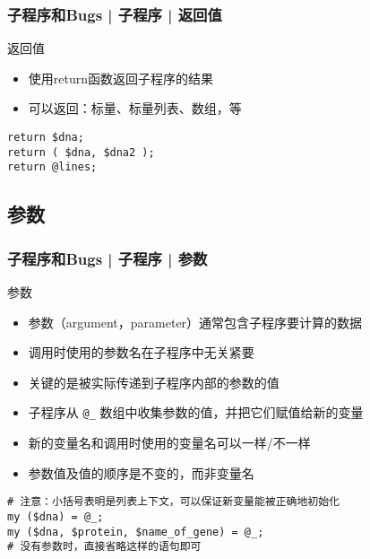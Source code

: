 \begin{frame}[fragile]
  \frametitle{子程序和Bugs | 子程序 | \alert{返回值}}
  \begin{block}{返回值}
    \begin{itemize}
      \item 使用return函数返回子程序的结果
      \item 可以返回：标量、标量列表、数组，等
    \end{itemize}
  \end{block}
\begin{lstlisting}
return $dna;
return ( $dna, $dna2 );
return @lines;
\end{lstlisting}
\end{frame}

\subsection{参数}
\begin{frame}[fragile]
  \frametitle{子程序和Bugs | 子程序 | \alert{参数}}
  \begin{block}{参数}
    \begin{itemize}
      \item 参数（argument，parameter）通常包含子程序要计算的数据
      \item 调用时使用的参数名在子程序中无关紧要
      \item 关键的是被实际传递到子程序内部的参数的值
      \item 子程序从 \verb|@_| 数组中收集参数的值，并把它们赋值给新的变量
      \item 新的变量名和调用时使用的变量名可以一样/不一样
      \item 参数值及值的顺序是不变的，而非变量名
    \end{itemize}
  \end{block}
\begin{lstlisting}
# 注意：小括号表明是列表上下文，可以保证新变量能被正确地初始化
my ($dna) = @_;
my ($dna, $protein, $name_of_gene) = @_;
# 没有参数时，直接省略这样的语句即可
\end{lstlisting}
\end{frame}

